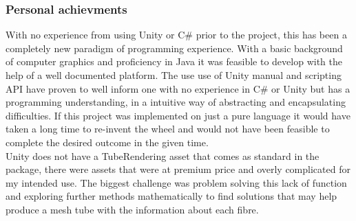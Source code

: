 \documentclass[12pt]{article} %
\begin{document}
\begin{flushleft}
\subsubsection{Personal achievments} %
With no experience from using Unity or C\# prior to the project, this has been a completely new paradigm of programming experience. With a basic background of computer graphics and proficiency in Java it was feasible to develop with the help of a well documented platform. The use use of Unity manual and scripting API have proven to well inform one with no experience in C\# or Unity but has a programming understanding, in a intuitive way of abstracting and encapsulating difficulties. If this project was implemented on just a pure language it would have taken a long time to re-invent the wheel and would not have been feasible to complete the desired outcome in the given time. \\
Unity does not have a TubeRendering asset that comes as standard in the package, there were assets that were at premium price and overly complicated for my intended use. The biggest challenge was problem solving this lack of function and exploring further methods mathematically to find solutions that may help produce a mesh tube with the information about each fibre.

\end{flushleft}
\end{document}
